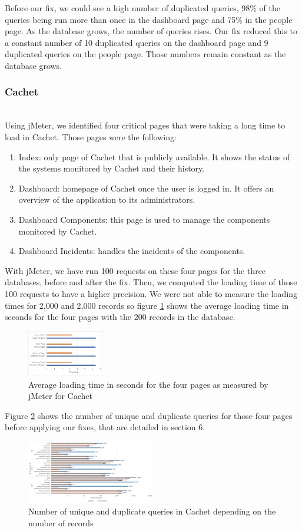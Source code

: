 \documentclass[sigconf]{acmart}
\begin{document}
Before our fix, we could see a high number of duplicated queries, 98\% of the queries being run more than once in the dashboard page and 75\%  in the people page. As the database grows, the number of queries rises. Our fix reduced this to a constant number of 10 duplicated queries on the dashboard page and 9 duplicated queries on the people page. Those numbers remain constant as the database grows.\newpage
\subsubsection{Cachet}~\\
Using jMeter, we identified four critical pages that were taking a long time to load in Cachet. Those pages were the following:
\begin{enumerate}
\item Index: only page of Cachet that is publicly available. It shows the status of the systems monitored by Cachet and their history. 
\item Dashboard: homepage of Cachet once the user is logged in. It offers an overview of the application to its administrators.
\item Dashboard Components: this page is used to manage the components monitored by Cachet. 
\item Dashboard Incidents: handles the incidents of the components. 
\end{enumerate}
With jMeter, we have run 100 requests on these four pages for the three databases, before and after the fix. Then, we computed the loading time of those 100 requests to have a higher precision. We were not able to measure the loading times for 2,000 and 2,000 records so figure \ref{CachetGraphs} shows the average loading time in seconds for the four pages with the 200 records in the database.
\begin{figure}[b!]
\includegraphics[width=0.3\textwidth]{CachetGraphs}
\caption{Average loading time in seconds for the four pages as measured by jMeter for Cachet}
\label{CachetGraphs}
\end{figure}
Figure \ref{cachetqueries} shows the number of unique and duplicate queries for those four pages before applying our fixes, that are detailed in section 6.
\begin{figure}[t!]
\includegraphics[width=0.5\textwidth]{cachetqueries}
\caption{Number of unique and duplicate queries in Cachet depending on the number of records}
\label{cachetqueries}
\end{figure}
\end{document}
